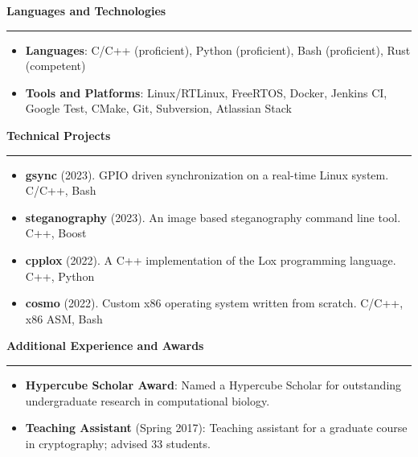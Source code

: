 \documentclass[12pt,letterpaper]{article}
\begin{document}
\medskip

\begin{large}
    \textbf{Languages and Technologies}
\end{large}

\smallskip \hrule \medskip

\begin{itemize}[topsep=0pt]
    \setlength\itemsep{0.2em}
    \item \textbf{Languages}: C/C++ (proficient),
                              Python (proficient),
                              Bash (proficient),
                              Rust (competent)
    \item \textbf{Tools and Platforms}: Linux/RTLinux,
                                        FreeRTOS,
                                        Docker,
                                        Jenkins CI,
                                        Google Test,
                                        CMake,
                                        Git,
                                        Subversion,
                                        Atlassian Stack
\end{itemize}

\medskip

\begin{large}
    \textbf{Technical Projects}
\end{large}

\smallskip \hrule \medskip

\begin{itemize}[topsep=0pt]
    \setlength\itemsep{0.2em}
    \item \textbf{gsync} (2023). GPIO driven synchronization on a real-time
                                 Linux system. C/C++, Bash
    \item \textbf{steganography} (2023). An image based steganography command
                                         line tool. C++, Boost
    \item \textbf{cpplox} (2022). A C++ implementation of the Lox programming
                                  language. C++, Python
    \item \textbf{cosmo} (2022). Custom x86 operating system written from
                                 scratch. C/C++, x86 ASM, Bash
\end{itemize}

\medskip

\begin{large}
    \textbf{Additional Experience and Awards}
\end{large}

\smallskip \hrule \medskip

\begin{itemize}[topsep=0pt]
    \setlength\itemsep{0.2em}
    \item \textbf{Hypercube Scholar Award}: Named a Hypercube Scholar for
          outstanding undergraduate research in computational biology.
    \item \textbf{Teaching Assistant} (Spring 2017): Teaching assistant for a
          graduate course in cryptography; advised 33 students.
\end{itemize}
\end{document}
